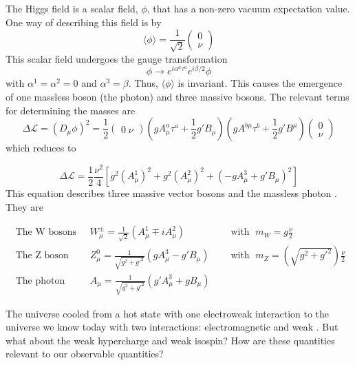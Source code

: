 The Higgs field is a scalar field, $\phi$, that has a non-zero vacuum expectation value. One way of describing this field is by 
\begin{equation}
    \langle \phi \rangle = \frac{1}{\sqrt{2}}
    \begin{pmatrix}
    0 \\
    \nu
    \end{pmatrix}
\end{equation}
This scalar field undergoes the gauge transformation
\begin{equation}
    \phi \rightarrow e^{i\alpha^{a}\tau^{a}}e^{i\beta/2}\phi 
\end{equation}
with $\alpha^{1} = \alpha^{2} = 0$ and $\alpha^{3} = \beta$. Thus, $\langle \phi \rangle$ is invariant. This causes the emergence of one massless boson (the photon) and three massive bosons. The relevant terms for determining the masses are 
\begin{equation}
    \Delta \mathcal{L} = (D_{\mu}\phi)^{2} = \frac{1}{2}
    \begin{pmatrix}
    0 \; \nu
    \end{pmatrix}
    (g A^{a}_{\mu} \tau^{a} + \frac{1}{2}g'B_{\mu})(gA^{b\mu}\tau^{b}+\frac{1}{2}g'B^{\mu})
    \begin{pmatrix}
    0 \\
    \nu
    \end{pmatrix}
\end{equation}
which reduces to

\begin{equation}
    \Delta \mathcal{L} = \frac{1}{2}\frac{\nu^{2}}{4}[g^{2}(A^{1}_{\mu})^2+g^{2}(A^{2}_{\mu})^{2}+(-gA^{3}_{\mu} + g'B_{\mu})^{2}]
\end{equation}
This equation describes three massive vector bosons and the massless photon \cite{Peskin}. They are 

\begin{align}
    \textrm{ The W bosons } \; &W^{\pm}_{\mu}=\frac{1}{\sqrt{2}} (A^{1}_{\mu} \mp iA^{2}_{\mu}) \; &&\textrm{  with  } \; m_{W} = g\frac{\nu}{2} \\
    \textrm{ The Z boson } \; &Z^{0}_{\mu}= \frac{1}{\sqrt{g^{2}+g'^{2}}}(gA^{3}_{\mu} - g'B_{\mu}) \; &&\textrm{  with  } \; m_{Z} = (\sqrt{g^{2}+g'^{2}})\frac{\nu}{2} \\
    \textrm{ The photon } \; &A_{\mu}=\frac{1}{\sqrt{g^{2}+g'^{2}}}(g'A^{3}_{\mu}+gB_{\mu})
\end{align}

The universe cooled from a hot state with one electroweak interaction to the universe we know today with two interactions: electromagnetic and weak \cite{Peskin}. But what about the weak hypercharge and weak isospin? How are these quantities relevant to our observable quantities? 

